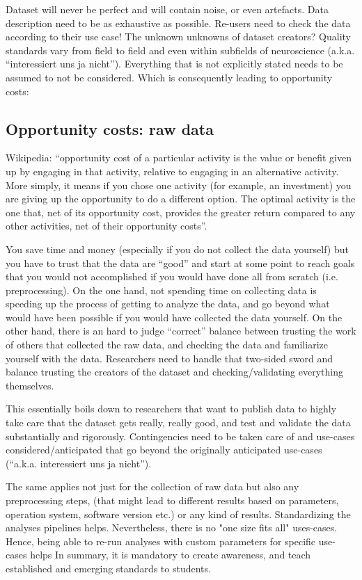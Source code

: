 %
Dataset will never be perfect and will contain noise, or even artefacts.
%
Data description need to be as exhaustive as possible.
%
Re-users need to check the data according to their use case!
%
The unknown unknowns of dataset creators?
%
Quality standards vary from field to field and even within subfields of
neuroscience (a.k.a. ``interessiert uns ja nicht'').
%
Everything that is not explicitly stated needs to be assumed to not be
considered.
%
Which is consequently leading to opportunity costs:


\subsection{Opportunity costs: raw data}

Wikipedia: ``opportunity cost of a particular activity is the value or benefit
given up by engaging in that activity, relative to engaging in an alternative
activity.
%
More simply, it means if you chose one activity (for example, an investment) you
are giving up the opportunity to do a different option.
%
The optimal activity is the one that, net of its opportunity cost, provides the
greater return compared to any other activities, net of their opportunity
costs''.

%
You save time and money (especially if you do not collect the data yourself) but
you have to trust that the data are ``good'' and start at some point to reach
goals that you would not accomplished if you would have done all from scratch
(i.e. preprocessing).
%
On the one hand, not spending time on collecting data is speeding up the process
of getting to analyze the data, and go beyond what would have been possible if
you would have collected the data yourself.
%
On the other hand, there is an hard to judge ``correct'' balance between
trusting the work of others that collected the raw data, and checking the data
and familiarize yourself with the data.
%
Researchers need to handle that two-sided sword and balance trusting the
creators of the dataset and checking/validating everything themselves.

%
This essentially boils down to researchers that want to publish data to highly
take care that the dataset gets really, really good, and test and validate the
data substantially and rigorously.
%
Contingencies need to be taken care of and use-cases considered/anticipated that
go beyond the originally anticipated use-cases (``a.k.a. interessiert uns ja
nicht'').

%
The same applies not just for the collection of raw data but also any
preprocessing steps, (that might lead to different results based on parameters,
operation system, software version etc.) or any kind of results.
%
Standardizing the analyses pipelines helps.
%
Nevertheless, there is no "one size fits all" uses-cases.
%
Hence, being able to re-run analyses with custom parameters for specific
use-cases helps
%
In summary, it is mandatory to create awareness, and teach established and
emerging standards to students.


